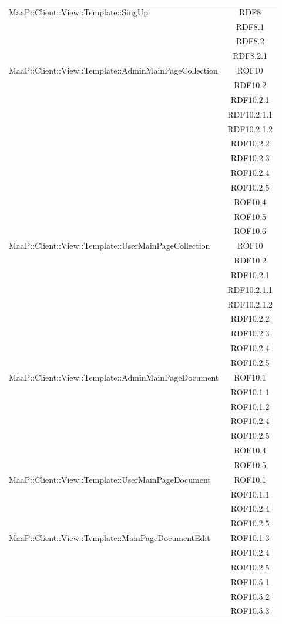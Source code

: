 \begin{center}
\begin{longtable}{|p{0.8\linewidth}|c|}
\midrule 
MaaP::Client::View::Template::SingUp
& RDF8\\
& RDF8.1\\
& RDF8.2\\
& RDF8.2.1\\

\midrule 
MaaP::Client::View::Template::AdminMainPageCollection
& ROF10\\
& RDF10.2\\
& RDF10.2.1\\
& RDF10.2.1.1\\
& RDF10.2.1.2\\
& RDF10.2.2\\
& RDF10.2.3\\
& ROF10.2.4\\
& ROF10.2.5\\
& ROF10.4\\
& ROF10.5\\
& ROF10.6\\


\midrule 
MaaP::Client::View::Template::UserMainPageCollection
& ROF10\\
& RDF10.2\\
& RDF10.2.1\\
& RDF10.2.1.1\\
& RDF10.2.1.2\\
& RDF10.2.2\\
& RDF10.2.3\\
& ROF10.2.4\\
& ROF10.2.5\\

\midrule 
MaaP::Client::View::Template::AdminMainPageDocument
& ROF10.1\\
& ROF10.1.1\\
& ROF10.1.2\\
& ROF10.2.4\\
& ROF10.2.5\\
& ROF10.4\\
& ROF10.5\\


\midrule 
MaaP::Client::View::Template::UserMainPageDocument
& ROF10.1\\
& ROF10.1.1\\
& ROF10.2.4\\
& ROF10.2.5\\


\midrule 
MaaP::Client::View::Template::MainPageDocumentEdit
& ROF10.1.3\\
& ROF10.2.4\\
& ROF10.2.5\\
& ROF10.5.1\\
& ROF10.5.2\\
& ROF10.5.3\\



\end{longtable}
\end{center}
